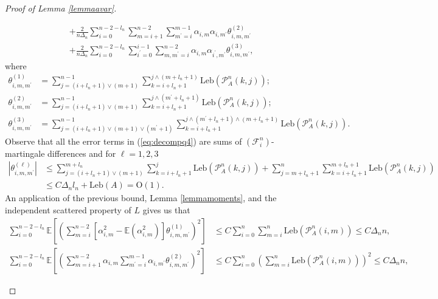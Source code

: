 \documentclass[10pt,a4paper]{amsart}
\newcommand{\Leb}{\ensuremath{\mathrm{Leb}}}
\begin{document}
\begin{proof}[Proof of Lemma \ref{lemmaavar}]
\begin{description}
\begin{equation}
\begin{aligned}
				& +\frac{2}{n\Delta_{n}}\sum_{i=0}^{n-2-l_{n}}\sum_{m=i+1}^{n-2}\sum_{m^{\prime}=i}^{m-1}\alpha_{i,m}\alpha_{i,m^{\prime}}\theta_{i,m,m^{\prime}}^{(2)}\\
				& +\frac{2}{n\Delta_{n}}\sum_{i=0}^{n-2-l_{n}}\sum_{i^{\prime}=0}^{i-1}\sum_{m,m^{\prime}=i}^{n-2}\alpha_{i,m}\alpha_{i^{\prime},m^{\prime}}\theta_{i,m,m^{\prime}}^{(3)},
			\end{aligned}
			\label{eq:decompq4}
		\end{equation}
		where 
		\begin{equation}
			\begin{aligned}\theta_{i,m,m^{\prime}}^{(1)} & =\sum_{j=(i+l_{n}+1)\lor(m+1)}^{n-1}\sum_{k=i+l_{n}+1}^{j\land(m+l_{n}+1)}\Leb(\mathcal{P}_{A}^{n}(k,j));\\
				\theta_{i,m,m^{\prime}}^{(2)} & =\sum_{j=(i+l_{n}+1)\lor(m+1)}^{n-1}\sum_{k=i+l_{n}+1}^{j\land(m^{\prime}+l_{n}+1)}\Leb(\mathcal{P}_{A}^{n}(k,j));\\
				\theta_{i,m,m^{\prime}}^{(3)} & =\sum_{j=(i+l_{n}+1)\lor(m+1)\lor(m^{\prime}+1)}^{n-1}\sum_{k=i+l_{n}+1}^{j\land(m^{\prime}+l_{n}+1)\land(m+l_{n}+1)}\Leb(\mathcal{P}_{A}^{n}(k,j)).
			\end{aligned}
			\label{eq:that123def}
		\end{equation}
		Observe that all the error terms in (\ref{eq:decompq4}) are sums
		of $(\mathscr{F}_{i}^{n})$-martingale differences and for $\ell=1,2,3$
		\begin{align*}
			\left|\theta_{i,m,m^{\prime}}^{(\ell)}\right| & \leq\sum_{j=(i+l_{n}+1)\lor(m+1)}^{m+l_{n}}\sum_{k=i+l_{n}+1}^{j}\Leb(\mathcal{P}_{A}^{n}(k,j))+\sum_{j=m+l_{n}+1}^{n}\sum_{k=i+l_{n}+1}^{m+l_{n}+1}\Leb(\mathcal{P}_{A}^{n}(k,j))\\
			& \leq C\Delta_{n}l_{n}+\Leb(A)=\mathrm{O}(1).
		\end{align*}
		An application of the previous bound, Lemma \ref{lemmamoments}, 
		and the independent scattered property of $L$ gives us that 
		\begin{align*}
			\sum_{i=0}^{n-2-l_{n}}\mathbb{E}\left[\left(\sum_{m=i}^{n-2}[\alpha_{i,m}^{2}-\mathbb{E}(\alpha_{i,m}^{2})]\theta_{i,m,m^{\prime}}^{(1)}\right)^{2}\right] & \leq C\sum_{i=0}^{n}\sum_{m=i}^{n}\Leb(\mathcal{P}_{A}^{n}(i,m))\leq C\Delta_{n}n,\\
			\sum_{i=0}^{n-2-l_{n}}\mathbb{E}\left[\left(\sum_{m=i+1}^{n-2}\alpha_{i,m}\sum_{m^{\prime}=i}^{m-1}\alpha_{i,m^{\prime}}\theta_{i,m,m^{\prime}}^{(2)}\right)^{2}\right] & \leq C\sum_{i=0}^{n}\left(\sum_{m=i}^{n}\Leb(\mathcal{P}_{A}^{n}(i,m))\right)^{2}\leq C\Delta_{n}n,

\end{align*}
\end{description}
\end{proof}
\end{document}
